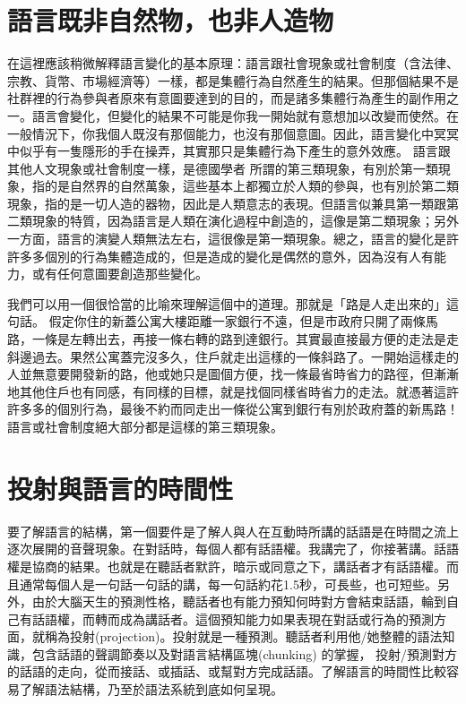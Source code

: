 \section{語言既非自然物，也非人造物} %

在這裡應該稍微解釋語言變化的基本原理：語言跟社會現象或社會制度（含法律、宗教、貨幣、市場經濟等）一樣，都是集體行為自然產生的結果。但那個結果不是社群裡的行為參與者原來有意圖要達到的目的，而是諸多集體行為產生的副作用之一。語言會變化，但變化的結果不可能是你我一開始就有意想加以改變而使然。在一般情況下，你我個人既沒有那個能力，也沒有那個意圖。因此，語言變化中冥冥中似乎有一隻隱形的手在操弄，其實那只是集體行為下產生的意外效應。 語言跟其他人文現象或社會制度一樣，是德國學者\citet{Keller1994} 所謂的第三類現象，有別於第一類現象，指的是自然界的自然萬象，這些基本上都獨立於人類的參與，也有別於第二類現象，指的是一切人造的器物，因此是人類意志的表現。但語言似兼具第一類跟第二類現象的特質，因為語言是人類在演化過程中創造的，這像是第二類現象；另外一方面，語言的演變人類無法左右，這很像是第一類現象。總之，語言的變化是許許多多個別的行為集體造成的，但是造成的變化是偶然的意外，因為沒有人有能力，或有任何意圖要創造那些變化。     

我們可以用一個很恰當的比喻來理解這個中的道理。那就是「路是人走出來的」這句話。 假定你住的新蓋公寓大樓距離一家銀行不遠，但是市政府只開了兩條馬路，一條是左轉出去，再接一條右轉的路到達銀行。其實最直接最方便的走法是走斜邊過去。果然公寓蓋完沒多久，住戶就走出這樣的一條斜路了。一開始這樣走的人並無意要開發新的路，他或她只是圖個方便，找一條最省時省力的路徑，但漸漸地其他住戶也有同感，有同樣的目標，就是找個同樣省時省力的走法。就憑著這許許多多的個別行為，最後不約而同走出一條從公寓到銀行有別於政府蓋的新馬路！語言或社會制度絕大部分都是這樣的第三類現象。

\section{投射與語言的時間性} %

要了解語言的結構，第一個要件是了解人與人在互動時所講的話語是在時間之流上逐次展開的音聲現象。在對話時，每個人都有話語權。我講完了，你接著講。話語權是協商的結果。也就是在聽話者默許，暗示或同意之下，講話者才有話語權。而且通常每個人是一句話一句話的講，每一句話約花1.5秒，可長些，也可短些。另外，由於大腦天生的預測性格，聽話者也有能力預知何時對方會結束話語，輪到自己有話語權，而轉而成為講話者。這個預知能力如果表現在對話或行為的預測方面，就稱為投射(projection)。投射就是一種預測。聽話者利用他/她整體的語法知識，包含話語的聲調節奏以及對語言結構區塊(chunking) 的掌握， 投射/預測對方的話語的走向，從而接話、或插話、或幫對方完成話語。了解語言的時間性比較容易了解語法結構，乃至於語法系統到底如何呈現。

